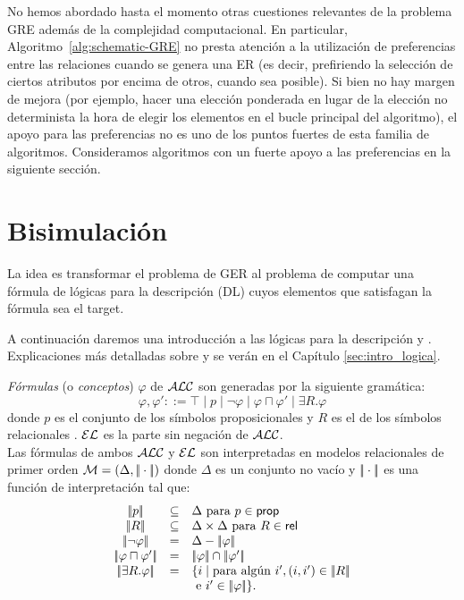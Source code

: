 No hemos abordado hasta el momento otras cuestiones relevantes de la
problema GRE adem\'as de la complejidad computacional. En particular,
Algoritmo~\ref{alg:schematic-GRE} no presta atenci\'on a la utilizaci\'on de
preferencias entre las relaciones cuando se genera una ER (es decir, prefiriendo
la selecci\'on de ciertos atributos por encima de otros, cuando sea posible).
Si bien no hay margen de mejora (por ejemplo, hacer una elecci\'on ponderada
en lugar de la elecci\'on no determinista la hora de elegir los elementos
en el bucle principal del algoritmo), el apoyo para las preferencias no es
uno de los puntos fuertes de esta familia de algoritmos.
Consideramos algoritmos con un fuerte apoyo a las preferencias en la siguiente secci\'on.


\section{Bisimulaci\'on}
\label{sec:bisimulacion}


La idea es transformar el problema de GER al problema de computar una f\'ormula de l\'ogicas para la descripci\'on (DL) cuyos elementos que satisfagan la f\'ormula sea el target.%

A continuaci\'on daremos una introducci\'on a las l\'ogicas para la descripci\'on \alc y \el. Explicaciones m\'as detalladas sobre \alc y \el se ver\'an en el Cap\'itulo \ref{sec:intro_logica}.

\emph{F\'ormulas} (o \emph{conceptos}) $\varphi$ de $\mathcal{ALC}$ son generadas por la siguiente gram\'atica:
$$
\varphi,\varphi' ::= \top \mid p \mid \neg \varphi \mid \varphi \sqcap \varphi'
\mid \exists R. \varphi
$$
donde $p$ es el conjunto de los s\'imbolos proposicionales \prop y $R$ es el de los s\'imbolos relacionales \rel. $\mathcal{EL}$ es la parte sin negaci\'on de $\mathcal{ALC}$.\\

Las f\'ormulas de ambos $\mathcal{ALC}$ y $\mathcal{EL}$ son interpretadas en modelos relacionales de primer orden $\mathcal{M} = (\Delta,|\!|\cdot|\!|)$ donde
$\Delta$ es un conjunto no vac\'io y $|\!|\cdot|\!|$ es una funci\'on de interpretaci\'on tal que:
$$
\begin{array}{ccl}
\interp{p} & \subseteq & \Delta  \mbox{ para $p \in \prop$}\\
\interp{R} & \subseteq & \Delta \times \Delta  \mbox{ para $R \in \rel$}\\
\interp{\neg \varphi} & = & \Delta - \interp{\varphi}\\
\interp{\varphi \sqcap \varphi'} & = & \interp{\varphi} \cap \interp{\varphi'}\\
\interp{\exists R.\varphi} & = & \{i \mid \mbox{para alg\'un } i', (i,i') \in \interp{R}\\
& & \mbox{ e } i' \in \interp{\varphi} \}.\\
\end{array}
$$

